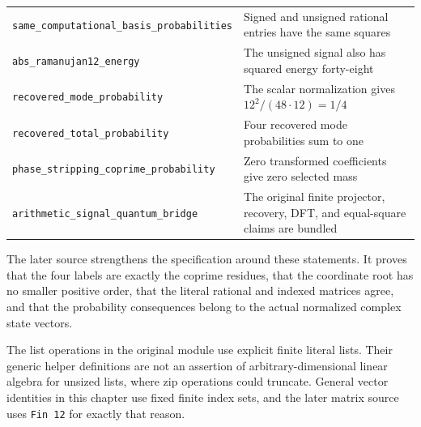 {\begin{longtable}[]{@{}
  >{\raggedright\arraybackslash}p{}
  >{\raggedright\arraybackslash}p{}@{}}
\texttt{same\_computational\_basis\_probabilities} & Signed and unsigned
rational entries have the same squares \\
\texttt{abs\_ramanujan12\_energy} & The unsigned signal also has squared
energy forty-eight \\
\texttt{recovered\_mode\_probability} & The scalar normalization gives
\(12^2/(48\cdot12)=1/4\) \\
\texttt{recovered\_total\_probability} & Four recovered mode
probabilities sum to one \\
\texttt{phase\_stripping\_coprime\_probability} & Zero transformed
coefficients give zero selected mass \\
\texttt{arithmetic\_signal\_quantum\_bridge} & The original finite
projector, recovery, DFT, and equal-square claims are bundled \\
\end{longtable}}

The later source strengthens the specification around these statements.
It proves that the four labels are exactly the coprime residues, that
the coordinate root has no smaller positive order, that the literal
rational and indexed matrices agree, and that the probability
consequences belong to the actual normalized complex state vectors.

The list operations in the original module use explicit finite literal
lists. Their generic helper definitions are not an assertion of
arbitrary-dimensional linear algebra for unsized lists, where zip
operations could truncate. General vector identities in this chapter use
fixed finite index sets, and the later matrix source uses
\texttt{Fin\ 12} for exactly that reason.

